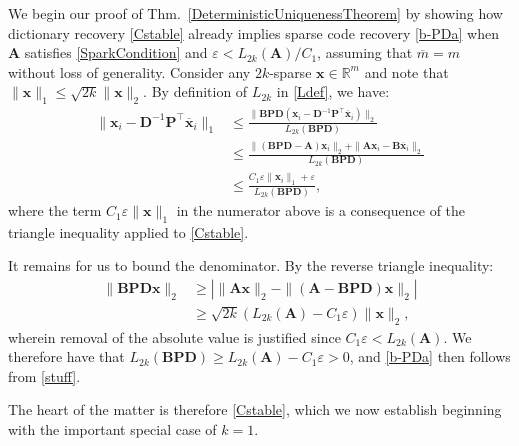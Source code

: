 \documentclass[journal, twocolumn]{IEEEtran}
\begin{document}
We begin our proof of Thm.~\ref{DeterministicUniquenessTheorem} by showing how dictionary recovery \eqref{Cstable} already implies sparse code recovery \eqref{b-PDa} when $\mathbf{A}$ satisfies \eqref{SparkCondition} and \mbox{$\varepsilon < L_{2k}(\mathbf{A}) / C_1$}, assuming that $\overline m = m$ without loss of generality. Consider any $2k$-sparse $\mathbf{x} \in \mathbb{R}^m$ and note that $\|\mathbf{x}\|_1 \leq \sqrt{2k}  \|\mathbf{x}\|_2$. By definition of $L_{2k}$ in \eqref{Ldef}, we have:
\begin{align}\label{stuff}
\|\mathbf{x}_i - \mathbf{D}^{-1}\mathbf{P}^{\top}\mathbf{\overline x}_i \|_1 \nonumber
&\leq \frac{\|\mathbf{BPD}(\mathbf{x}_i - \mathbf{D}^{-1}\mathbf{P}^{\top}\mathbf{\overline x}_i)\|_2}{L_{2k}(\mathbf{BPD})} \\ \nonumber
&\leq \frac{\|(\mathbf{BPD} - \mathbf{A})\mathbf{x}_i\|_2 + \|\mathbf{A}\mathbf{x}_i - \mathbf{B}\mathbf{\overline x}_i\|_2}{L_{2k}(\mathbf{BPD})} \\
&\leq \frac{C_1\varepsilon \|\mathbf{x}_i\|_1 + \varepsilon}{L_{2k}(\mathbf{BPD})},
\end{align}
where the term $C_1\varepsilon \|\mathbf{x}\|_1$ in the numerator above is a consequence of the triangle inequality applied to \eqref{Cstable}.

It remains for us to bound the denominator.  By the reverse triangle inequality:
\begin{align*}
\|\mathbf{BPD}\mathbf{x}\|_2 
&\geq | \|\mathbf{A}\mathbf{x}\|_2 - \|(\mathbf{A}-\mathbf{BPD})\mathbf{x}\|_2 | \\
&\geq \sqrt{2k} (L_{2k}(\mathbf{A}) -  C_1\varepsilon) \|\mathbf{x}\|_2,
\end{align*}
%
wherein removal of the absolute value is justified since $C_1\varepsilon < L_{2k}(\mathbf{A})$. We therefore have that $L_{2k}(\mathbf{BPD}) \geq L_{2k}(\mathbf{A}) - C_1\varepsilon  > 0$, and \eqref{b-PDa} then follows from \eqref{stuff}.


The heart of the matter is therefore \eqref{Cstable}, which we now establish beginning with the important special case of $k = 1$. 
\end{document}
